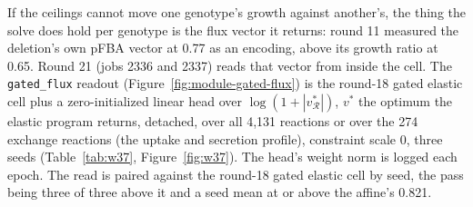 If the ceilings cannot move one genotype's growth against another's, the thing the
solve does hold per genotype is the flux vector it returns: round 11 measured the
deletion's own pFBA vector at 0.77 as an encoding, above its growth ratio at 0.65.
Round 21 (jobs 2336 and 2337) reads that vector from inside the cell. The
\texttt{gated\_flux} readout (Figure~\ref{fig:module-gated-flux}) is the round-18
gated elastic cell plus a zero-initialized linear head over $\log(1 + |v^*_{\mathcal{R}}|)$,
$v^*$ the optimum the elastic program returns, detached, over all 4,131 reactions or
over the 274 exchange reactions (the uptake and secretion profile), constraint scale 0,
three seeds (Table~\ref{tab:w37}, Figure~\ref{fig:w37}). The head's weight norm is
logged each epoch. The read is paired against the round-18 gated elastic cell by seed,
the pass being three of three above it and a seed mean at or above the affine's 0.821.







